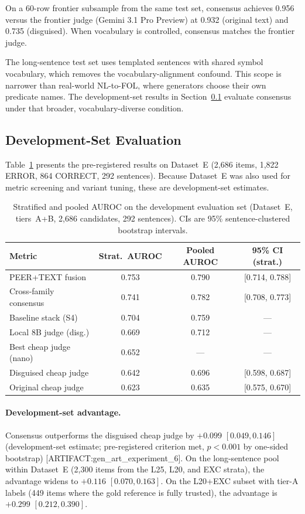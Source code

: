 \documentclass[11pt,letterpaper]{article}
\begin{document}
On a 60-row frontier subsample from the same test set, consensus achieves 0.956 versus the frontier judge (Gemini 3.1 Pro Preview) at 0.932 (original text) and 0.735 (disguised).
When vocabulary is controlled, consensus matches the frontier judge.

The long-sentence test set uses templated sentences with shared symbol vocabulary, which removes the vocabulary-alignment confound.
This scope is narrower than real-world NL-to-FOL, where generators choose their own predicate names.
The development-set results in Section~\ref{sec:devset} evaluate consensus under that broader, vocabulary-diverse condition.

\subsection{Development-Set Evaluation}
\label{sec:devset}

Table~\ref{tab:main} presents the pre-registered results on Dataset~E (2,686 items, 1,822 ERROR, 864 CORRECT, 292 sentences).
Because Dataset~E was also used for metric screening and variant tuning, these are development-set estimates.

\begin{table}[!htbp]
\centering
\caption{Stratified and pooled AUROC on the development evaluation set (Dataset~E, tiers~A+B, 2,686 candidates, 292 sentences). CIs are 95\% sentence-clustered bootstrap intervals.}
\label{tab:main}
\begin{tabular}{lccc}
\toprule
Metric & Strat.\ AUROC & Pooled AUROC & 95\% CI (strat.) \\
\midrule
PEER+TEXT fusion     & 0.753 & 0.790 & [0.714, 0.788] \\
Cross-family consensus & 0.741 & 0.782 & [0.708, 0.773] \\
Baseline stack (S4)  & 0.704 & 0.759 & --- \\
Local 8B judge (disg.)& 0.669 & 0.712 & --- \\
Best cheap judge (nano)& 0.652 & --- & --- \\
Disguised cheap judge & 0.642 & 0.696 & [0.598, 0.687] \\
Original cheap judge  & 0.623 & 0.635 & [0.575, 0.670] \\
\bottomrule
\end{tabular}
\end{table}

\paragraph{Development-set advantage.}
Consensus outperforms the disguised cheap judge by $+0.099$ $[0.049, 0.146]$ (development-set estimate; pre-registered criterion met, $p < 0.001$ by one-sided bootstrap) [ARTIFACT:gen\_art\_experiment\_6].
On the long-sentence pool within Dataset~E (2,300 items from the L25, L20, and EXC strata), the advantage widens to $+0.116$ $[0.070, 0.163]$.
On the L20+EXC subset with tier-A labels (449 items where the gold reference is fully trusted), the advantage is $+0.299$ $[0.212, 0.390]$.
\end{document}
